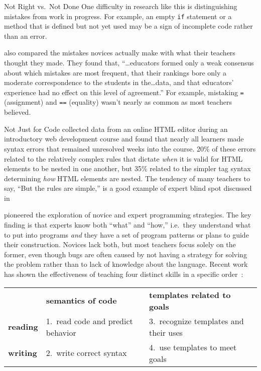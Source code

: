 \begin{aside}{Not Right vs.\ Not Done}
  One difficulty in research like this is distinguishing mistakes from work in progress.
  For example,
  an empty \texttt{if} statement or a method that is defined but not yet used
  may be a sign of incomplete code rather than an error.
\end{aside}

\cite{Brow2017} also compared the mistakes novices actually make
with what their teachers thought they made.
They found that,
``{\ldots}educators formed only a weak consensus about which mistakes are most frequent,
that their rankings bore only a moderate correspondence to the students in the{\ldots}data,
and that educators' experience had no effect on this level of agreement.''
For example,
mistaking \texttt{=} (assignment) and \texttt{==} (equality)
wasn't nearly as common as most teachers believed.

\begin{aside}{Not Just for Code}
  \cite{Park2015} collected data from an online HTML editor during an introductory web development course
  and found that nearly all learners made syntax errors that remained unresolved weeks into the course.
  20\% of these errors related to the relatively complex rules
  that dictate \emph{when} it is valid for HTML elements to be nested in one another,
  but 35\% related to the simpler tag syntax determining \emph{how} HTML elements are nested.
  The tendency of many teachers to say,
  ``But the rules are simple,''
  is a good example of expert blind spot discussed in 
\end{aside}


\cite{Solo1984,Solo1986} pioneered the exploration of novice and expert programming strategies.
The key finding is that experts know both ``what'' and ``how,''
i.e.\ they understand what to put into programs
\emph{and} they have a set of program patterns or plans to guide their construction.
Novices lack both,
but most teachers focus solely on the former,
even though bugs are often caused by not having a strategy for solving the problem
rather than to lack of knowledge about the language.
Recent work has shown the effectiveness of teaching four distinct skills in a specific order~\cite{Xie2019}:

\begin{longtable}{lll}
		        & \textbf{semantics of code}   		& \textbf{templates related to goals} \\
\textbf{reading}	& 1.\ read code and predict behavior	& 3.\ recognize templates and their uses \\
\textbf{writing}	& 2.\ write correct syntax		& 4.\ use templates to meet goals
\end{longtable}

